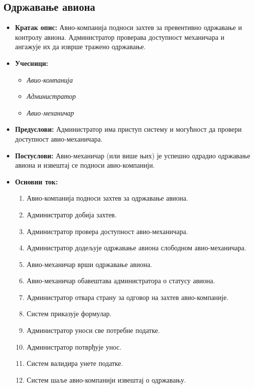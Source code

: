 \documentclass{article}
\begin{document}
\newpage
\subsection{Одржавање авиона}

\begin{itemize}
    \item \textbf{Кратак опис:} Авио-компанија подноси захтев за превентивно одржавање и контролу авиона. Администратор проверава доступност механичара и ангажује их да изврше тражено одржавање.
    \item \textbf{Учесници:}
        \begin{itemize}
            \item \textit{Авио-компанија}
            \item \textit{Администратор}
            \item \textit{Авио-механичар}
        \end{itemize}
    \item \textbf{Предуслови:} Администратор има приступ систему и могућност да провери доступност авио-механичара.
    \item \textbf{Постуслови:} Авио-механичар (или више њих) је успешно одрадио одржавање авиона и извештај се подноси авио-компанији.
    \item \textbf{Основни ток:}
        \begin{enumerate}
            \item Авио-компанија подноси захтев за одржавање авиона.
            \item Администратор добија захтев.
            \item Администратор провера доступност авио-механичара.
            \item Администратор додељује одржавање авиона слободном авио-механичара.
            \item Авио-механичар врши одржавање авиона.
            \item Авио-механичар обавештава администратора о статусу авиона.
            \item Администратор отвара страну за одговор на захтев авио-компаније.
            \item Систем приказује формулар.
            \item Администратор уноси све потребне податке.
            \item Администратор потврђује унос.
            \item Систем валидира унете податке.
            \item Систем шаље авио-компанији извештај о одржавању.
        \end{enumerate}
        

\end{itemize}
\end{document}
